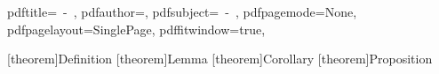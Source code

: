 \hypersetup
{
pdftitle={\TITLE\ -\ \SUBTITLE},
pdfauthor={\AUTHOR}, 
pdfsubject={\TITLE\ -\ \SUBTITLE}, %
pdfpagemode=None, %
pdfpagelayout=SinglePage, %
pdffitwindow=true, %
}

\usepackage[amsmath,standard,thmmarks,framed,thref]{ntheorem} %

[theorem]{Definition} 
[theorem]{Lemma}
[theorem]{Corollary}
[theorem]{Proposition}
\newtheorem{conjecture}[theorem]{Conjecture}
\newtheorem{axiom}[theorem]{Axiom}
\newtheorem{informaldefinition}[theorem]{Informal Definition}
\newtheorem{implementationnote}[theorem]{Implementation Note}
\newtheorem{syntacticconvention}[theorem]{Syntactic Convention}

\def\TheoremSymbol{\bullet}
\def\DefinitionSymbol{\bullet}
\def\PropositionSymbol{\bullet}


